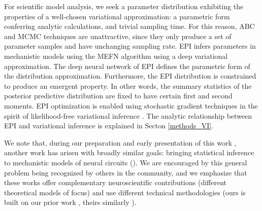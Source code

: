 \documentclass[11pt]{article}
\begin{document}
For scientific model analysis, we seek a parameter distribution exhibiting the properties of a well-chosen variational approximation: a parametric form conferring analytic calculations, and trivial sampling time.
For this reason, ABC and MCMC techniques are unattractive, since they only produce a set of parameter samples and have unchanging sampling rate.
EPI infers parameters in mechanistic models using the MEFN \cite{loaiza2017maximum} algorithm using a deep variational approximation.
The deep neural network of EPI defines the parametric form of the distribution approximation.
Furthermore, the EPI distribution is constrained to produce an emergent property.
In other words, the summary statistics of the posterior predictive distribution are fixed to have certain first and second moments.
EPI optimization is enabled using stochastic gradient techniques in the spirit of likelihood-free variational inference \cite{tran2017hierarchical}.
The analytic relationship between EPI and variational inference is explained in Secton \ref{methods_VI}.

 We note that, during our preparation and early presentation of this work \cite{bittner2019degenerate, bittner2019examining}, another work has arisen with broadly similar goals: bringing statistical inference to mechanistic models of neural circuits (\cite{nonnenmacher2018sbi, desitler2019statistical, gonccalves2019training}).%
We are encouraged by this general problem being recognized by others in the community, and we emphasize that these works offer complementary neuroscientific contributions (different theoretical models of focus) and use different technical methodologies (ours is built on our prior work \cite{loaiza2017maximum}, theirs similarly \cite{LueckmannGoncalves_17}).
\end{document}
